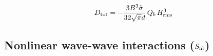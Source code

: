 \documentclass[12pt]{book}
\begin{document}
\begin{equation}
  D_{\rm tot} = - \frac{3 B^3 \tilde{\sigma}}{32 \sqrt{\pi} d} \, Q_b\, H^3_{\rm rms}
  \label{eq:tg83_2}
\end{equation}

\subsection{Nonlinear wave-wave interactions ($S_{\rm nl}$)} \label{sec:waveint}
\end{document}
